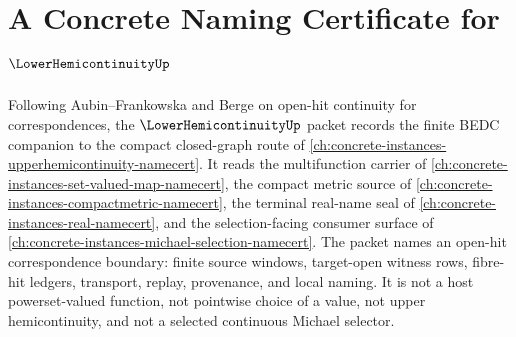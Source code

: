 \chapter{A Concrete Naming Certificate for $\LowerHemicontinuityUp$}
\label{ch:concrete-instances-lower-hemicontinuity-namecert}

Following Aubin--Frankowska and Berge on open-hit continuity for correspondences, the $\LowerHemicontinuityUp$ packet records the finite BEDC companion to the compact closed-graph route of \autoref{ch:concrete-instances-upperhemicontinuity-namecert}. It reads the multifunction carrier of \autoref{ch:concrete-instances-set-valued-map-namecert}, the compact metric source of \autoref{ch:concrete-instances-compactmetric-namecert}, the terminal real-name seal of \autoref{ch:concrete-instances-real-namecert}, and the selection-facing consumer surface of \autoref{ch:concrete-instances-michael-selection-namecert}. The packet names an open-hit correspondence boundary: finite source windows, target-open witness rows, fibre-hit ledgers, transport, replay, provenance, and local naming. It is not a host powerset-valued function, not pointwise choice of a value, not upper hemicontinuity, and not a selected continuous Michael selector.

